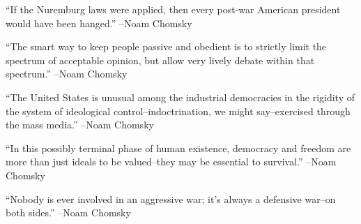\documentclass{article}%
\begin{document}
\begin{minipage}{\textwidth}%
\flushleft%
“If the Nuremburg laws were applied, then every post{-}war American president would have been hanged.”%
\linebreak%
\vspace{1mm}%
–Noam Chomsky%
\linebreak%
\vspace{1mm}%
\end{minipage}%
\linebreak%
\vspace{1mm}%
\begin{minipage}{\textwidth}%
\flushleft%
“The smart way to keep people passive and obedient is to strictly limit the spectrum of acceptable opinion, but allow very lively debate within that spectrum.”%
\linebreak%
\vspace{1mm}%
–Noam Chomsky%
\linebreak%
\vspace{1mm}%
\end{minipage}%
\linebreak%
\vspace{1mm}%
\begin{minipage}{\textwidth}%
\flushleft%
“The United States is unusual among the industrial democracies in the rigidity of the system of ideological control–indoctrination, we might say–exercised through the mass media.”%
\linebreak%
\vspace{1mm}%
–Noam Chomsky%
\linebreak%
\vspace{1mm}%
\end{minipage}%
\linebreak%
\vspace{1mm}%
\begin{minipage}{\textwidth}%
\flushleft%
“In this possibly terminal phase of human existence, democracy and freedom are more than just ideals to be valued–they may be essential to survival.”%
\linebreak%
\vspace{1mm}%
–Noam Chomsky%
\linebreak%
\vspace{1mm}%
\end{minipage}%
\linebreak%
\vspace{1mm}%
\begin{minipage}{\textwidth}%
\flushleft%
“Nobody is ever involved in an aggressive war; it's always a defensive war–on both sides.”%
\linebreak%
\vspace{1mm}%
–Noam Chomsky%
\linebreak%
\vspace{1mm}%
\end{minipage}%
\end{document}

